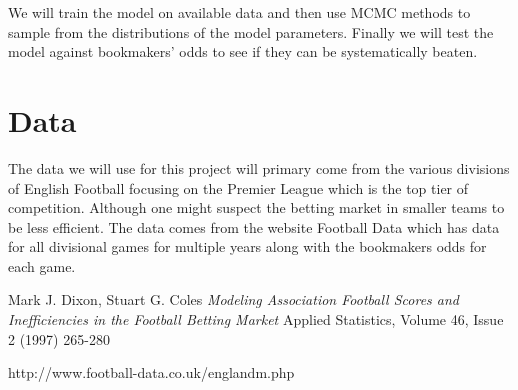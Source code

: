 \documentclass[12pt]{article}
\begin{document}
\par 
We will train the model on available data and then use 
MCMC methods to sample from the distributions of the model parameters. Finally
we will test the model against bookmakers' odds to see if they can be systematically
beaten. 

\section{Data}\label{data}
The data we will use for this project will primary come from the various divisions of
English Football focusing on the Premier League which is the top tier of competition.
Although one might suspect the betting market in smaller teams to be less efficient. 
The data comes from the website Football Data \cite{football-data} which has data for
all divisional games for multiple years along with the bookmakers odds for each game.

\begin{thebibliography}{1}

	 Mark J. Dixon, Stuart G. Coles {\em Modeling Association
	Football Scores and Inefficiencies in the Football Betting Market} Applied Statistics,
	Volume 46, Issue 2 (1997) 265-280
	
	 http://www.football-data.co.uk/englandm.php
	
\end{thebibliography}
\end{document}
